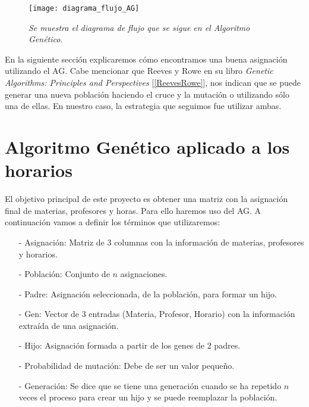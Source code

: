 \begin{figure}[H]
\centering
\texttt{[image: diagrama\_flujo\_AG]} %
\caption[\textit{Diagrama del Algoritmo Genético}]{\textit{Se muestra el diagrama de flujo que se sigue en el Algoritmo Genético.}}\label{fig_AG}
\end{figure}

En la siguiente sección explicaremos cómo encontramos una buena asignación utilizando el AG. Cabe mencionar que Reeves y Rowe en su libro \textit{Genetic Algorithms: Principles and Perspectives} [\ref{ReevesRowe}], nos indican que se puede generar una nueva población haciendo el cruce y la mutación o utilizando sólo una de ellas. En nuestro caso, la estrategia que seguimos fue utilizar ambas.


\section{Algoritmo Genético aplicado a los horarios}

El objetivo principal de este proyecto es obtener una matriz con la asignación final de materias, profesores y horas. Para ello haremos uso del AG. A continuación vamos a definir los términos que utilizaremos:

\begin{itemize}
\item[-] Asignación: Matriz de 3 columnas con la información de materias, profesores y horarios.

\item[-] Población: Conjunto de $n$ asignaciones.

\item[-] Padre: Asignación seleccionada, de la población, para formar un hijo.

\item[-] Gen: Vector de 3 entradas (Materia, Profesor, Horario) con la información extraída de una asignación.

\item[-] Hijo: Asignación formada a partir de los genes de 2 padres.

\item[-] Probabilidad de mutación: Debe de ser un valor pequeño. %

\item[-] Generación: Se dice que se tiene una generación cuando se ha repetido $n$ veces el proceso para crear un hijo y se puede reemplazar la población.
\end{itemize}

